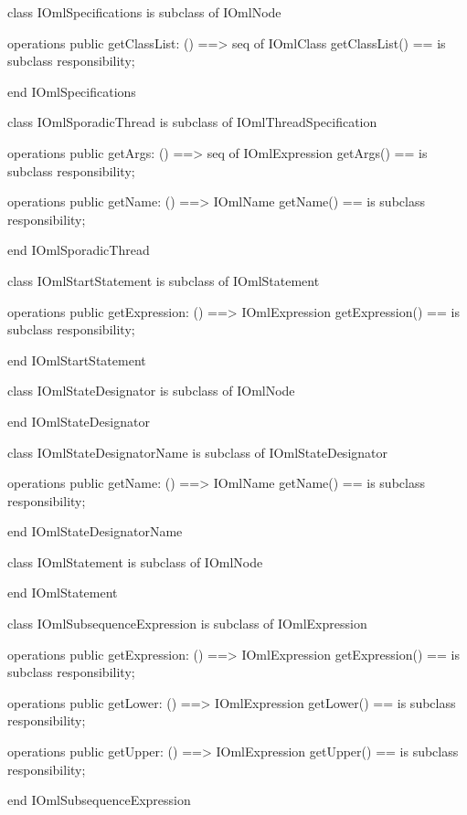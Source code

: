 \begin{vdm_al}
class IOmlSpecifications
 is subclass of IOmlNode

operations
  public getClassList: () ==> seq of IOmlClass
  getClassList() == is subclass responsibility;

end IOmlSpecifications
\end{vdm_al}

\begin{vdm_al}
class IOmlSporadicThread
 is subclass of IOmlThreadSpecification

operations
  public getArgs: () ==> seq of IOmlExpression
  getArgs() == is subclass responsibility;

operations
  public getName: () ==> IOmlName
  getName() == is subclass responsibility;

end IOmlSporadicThread
\end{vdm_al}

\begin{vdm_al}
class IOmlStartStatement
 is subclass of IOmlStatement

operations
  public getExpression: () ==> IOmlExpression
  getExpression() == is subclass responsibility;

end IOmlStartStatement
\end{vdm_al}

\begin{vdm_al}
class IOmlStateDesignator
 is subclass of IOmlNode

end IOmlStateDesignator
\end{vdm_al}

\begin{vdm_al}
class IOmlStateDesignatorName
 is subclass of IOmlStateDesignator

operations
  public getName: () ==> IOmlName
  getName() == is subclass responsibility;

end IOmlStateDesignatorName
\end{vdm_al}

\begin{vdm_al}
class IOmlStatement
 is subclass of IOmlNode

end IOmlStatement
\end{vdm_al}

\begin{vdm_al}
class IOmlSubsequenceExpression
 is subclass of IOmlExpression

operations
  public getExpression: () ==> IOmlExpression
  getExpression() == is subclass responsibility;

operations
  public getLower: () ==> IOmlExpression
  getLower() == is subclass responsibility;

operations
  public getUpper: () ==> IOmlExpression
  getUpper() == is subclass responsibility;

end IOmlSubsequenceExpression
\end{vdm_al}

